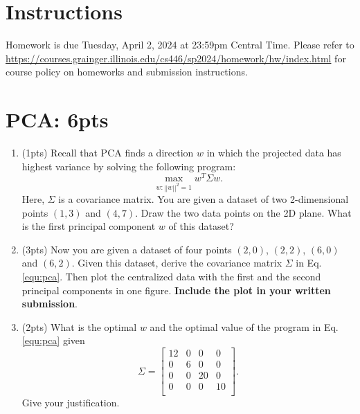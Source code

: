 \documentclass[12pt]{article}
\begin{document}
\singlespacing

\renewcommand{\familydefault}{\rmdefault}


\section{Instructions}

Homework is due Tuesday, April 2, 2024 at 23:59pm Central Time.
Please refer to \url{https://courses.grainger.illinois.edu/cs446/sp2024/homework/hw/index.html} for course policy on homeworks and submission instructions.


\section{PCA: 6pts}
\begin{enumerate}

\item (1pts) Recall that PCA finds a direction $w$ in which the projected data has highest variance by solving the following program:
    \begin{equation}
        \max_{w:||w||^2=1}w^T\Sigma w.
        \label{equ:pca}
    \end{equation}
Here, $\Sigma$ is a covariance matrix. You are given a dataset of two 2-dimensional points $(1,3)$ and $(4,7)$. Draw the two data points on the 2D plane. What is the first principal component $w$ of this dataset?

\item (3pts) Now you are given a dataset of four points $(2,0)$, $(2,2)$, $(6,0)$ and $(6,2)$. Given this dataset, derive the covariance matrix $\Sigma$ in Eq.\ref{equ:pca}. Then plot the centralized data with the first and the second principal components in one figure. \textbf{Include the plot in your written submission}.

\item (2pts) What is the optimal $w$ and the optimal value of the program in Eq.\ref{equ:pca}  given \[ \Sigma= \left[ \begin{array}{cccc}
	12 & 0 & 0 & 0\\
	0 & 6 & 0 & 0\\
	0 & 0 & 20 & 0\\
	0 & 0 & 0 & 10\\
	\end{array} \right].\] Give your justification.


\end{enumerate}
    
\end{document}
